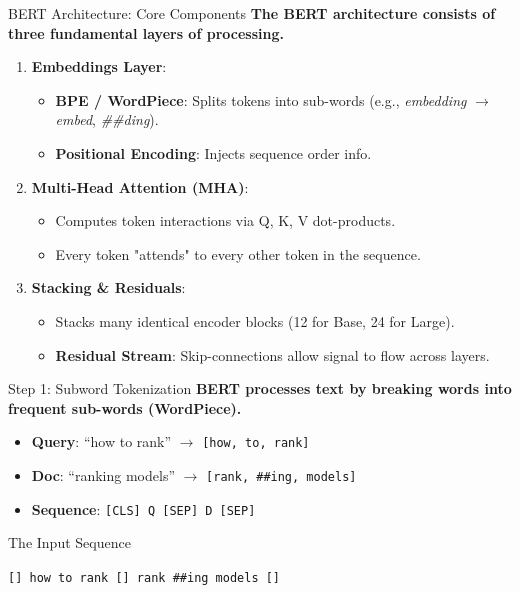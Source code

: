 \documentclass[aspectratio=169]{beamer}
\newif\ifanimated
\newcommand{\cpause}{\ifanimated\pause\fi}
\begin{document}
\begin{frame}{BERT Architecture: Core Components}
\textbf{The BERT architecture consists of three fundamental layers of processing.}

\vspace{0.8em}
\begin{enumerate}
    \item \textbf{Embeddings Layer}:
    \begin{itemize}
        \item \textbf{BPE / WordPiece}: Splits tokens into sub-words (e.g., \textit{embedding} $\to$ \textit{embed}, \textit{\#\#ding}).
        \item \textbf{Positional Encoding}: Injects sequence order info.
    \end{itemize}\cpause
    \item \textbf{Multi-Head Attention (MHA)}:
    \begin{itemize}
        \item Computes token interactions via Q, K, V dot-products.
        \item Every token "attends" to every other token in the sequence.
    \end{itemize}\cpause
    \item \textbf{Stacking \& Residuals}:
    \begin{itemize}
        \item Stacks many identical encoder blocks (12 for Base, 24 for Large).
        \item \textbf{Residual Stream}: Skip-connections allow signal to flow across layers.
    \end{itemize}
\end{enumerate}
\end{frame}

\begin{frame}{Step 1: Subword Tokenization}
\textbf{BERT processes text by breaking words into frequent sub-words (WordPiece).}

\vspace{0.8em}
\begin{itemize}
    \item \textbf{Query}: ``how to rank'' $\to$ \texttt{[how, to, rank]}
    \item \textbf{Doc}: ``ranking models'' $\to$ \texttt{[rank, \#\#ing, models]}
    \item \textbf{Sequence}: \texttt{[CLS] Q [SEP] D [SEP]}
\end{itemize}

\vspace{1.5em}
\cpause
\begin{block}{The Input Sequence}
\begin{center}
\texttt{[] how to rank [] rank \#\#ing models []}
\end{center}
\end{block}
\end{frame}
\end{document}
